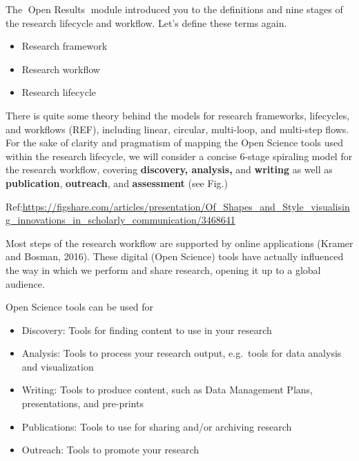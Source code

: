 \documentclass[
  letterpaper,
  DIV=11,
  numbers=noendperiod]{scrreport}
\providecommand{\tightlist}{%
  \setlength{\itemsep}{0pt}\setlength{\parskip}{0pt}}\usepackage{longtable,booktabs,array}
\begin{document}
The 🔗Open Results🔗 module introduced you to the definitions and nine
stages of the research lifecycle and workflow. Let's define these terms
again.

\begin{itemize}
\tightlist
\item
  Research framework
\item
  Research workflow
\item
  Research lifecycle
\end{itemize}

There is quite some theory behind the models for research frameworks,
lifecycles, and workflows (REF), including linear, circular, multi-loop,
and multi-step flows. For the sake of clarity and pragmatism of mapping
the Open Science tools used within the research lifecycle, we will
consider a concise 6-stage spiraling model for the research workflow,
covering \textbf{discovery, analysis,} and \textbf{writing} as well as
\textbf{publication}, \textbf{outreach}, and \textbf{assessment} (see
Fig.)

Ref:\url{https://figshare.com/articles/presentation/Of_Shapes_and_Style_visualising_innovations_in_scholarly_communication/3468641}

Most steps of the research workflow are supported by online applications
(Kramer and Bosman, 2016). These digital (Open Science) tools have
actually influenced the way in which we perform and share research,
opening it up to a global audience.

Open Science tools can be used for

\begin{itemize}
\tightlist
\item
  Discovery: Tools for finding content to use in your research
\item
  Analysis: Tools to process your research output, e.g.~tools for data
  analysis and visualization
\item
  Writing: Tools to produce content, such as Data Management Plans,
  presentations, and pre-prints
\item
  Publications: Tools to use for sharing and/or archiving research
\item
  Outreach: Tools to promote your research
\end{itemize}
\end{document}
